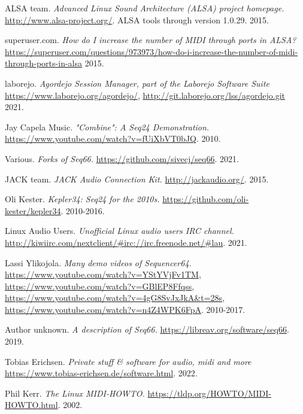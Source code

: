{\RaggedRight
\begin{thebibliography}{99}

   ALSA team.
   \emph{Advanced Linux Sound Architecture (ALSA) project homepage.}
   \url{http://www.alsa-project.org/}.
   ALSA tools through version 1.0.29.
   2015.

   superuser.com.
   \emph{How do I increase the number of MIDI through ports in ALSA?}
   \url{https://superuser.com/questions/973973/how-do-i-increase-the-number-of-midi-through-ports-in-alsa}
   2015.

   laborejo.
   \emph{Agordejo Session Manager, part of the Laborejo Software Suite}
   \url{https://www.laborejo.org/agordejo/},
   \url{http://git.laborejo.org/lss/agordejo.git}
   2021.

   Jay Capela Music.
   \emph{"Combine": A Seq24 Demonstration.}
   \url{https://www.youtube.com/watch?v=fUiXbVT0bJQ}.
   2010.

   Various.
   \emph{Forks of Seq66.}
   \url{https://github.com/sivecj/seq66}.
   2021.

   JACK team.
   \emph{JACK Audio Connection Kit.}
   \url{http://jackaudio.org/}.
   2015.

   Oli Kester.
   \emph{Kepler34: Seq24 for the 2010s.}
   \url{https://github.com/oli-kester/kepler34}.
   2010-2016.

   Linux Audio Users.
   \emph{Unofficial Linux audio users IRC channel.}
   \url{http://kiwiirc.com/nextclient/#irc://irc.freenode.net/#lau}.
   2021.

   Lassi Ylikojola.
   \emph{Many demo videos of Sequencer64.}
   \url{https://www.youtube.com/watch?v=YStYVjFv1TM},
   \url{https://www.youtube.com/watch?v=GBlEP8Ffqss},
   \url{https://www.youtube.com/watch?v=4gG8SvJxJkA&t=28s},
   \url{https://www.youtube.com/watch?v=n4Z4WPK6FpA}.
   2010-2017.

   Author unknown.
   \emph{A description of Seq66.}
   \url{https://libreav.org/software/seq66}.
   2019.

   Tobias Erichsen.
   \emph{Private stuff \& software for audio, midi and more}
   \url{https://www.tobias-erichsen.de/software.html}.
   2022.

   Phil Kerr.
   \emph{The Linux MIDI-HOWTO.}
   \url{https://tldp.org/HOWTO/MIDI-HOWTO.html}.
   2002.


\end{thebibliography}}
